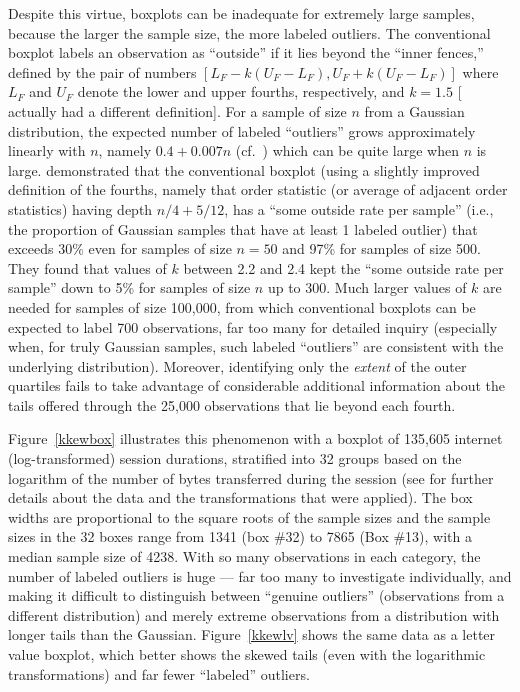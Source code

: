 \documentclass[oneside]{article}
\begin{document}
Despite this virtue, boxplots can be inadequate for extremely large samples,
because the larger the sample size, the more labeled outliers. The
conventional boxplot \citep{eda, emerson83} labels an observation as
``outside'' if it lies beyond the ``inner fences,'' defined by the pair of
numbers $[L_F - k(U_F - L_F), U_F + k(U_F - L_F)]$ where $L_F$ and $U_F$
denote the lower and upper fourths, respectively, and $k = 1.5$ [\citet{eda}
actually had a different definition]. For a sample of size $n$ from a Gaussian
distribution, the expected number of labeled ``outliers'' grows approximately
linearly with $n$, namely $0.4 + 0.007n$ (cf.~\citet{dchlv}) which can be
quite large when $n$ is large. \citet[pg. 1148]{dchbox} demonstrated that the
conventional boxplot (using a slightly improved definition of the fourths,
namely that order statistic (or average of adjacent order statistics) having
depth $n/4 + 5/12$, has a ``some outside rate per sample'' (i.e., the
proportion of Gaussian samples that have at least 1 labeled outlier) that
exceeds 30\% even for samples of size $n = 50$ and 97\% for samples of size
500. They found that values of $k$ between 2.2 and 2.4 kept the ``some outside
rate per sample'' down to 5\% for samples of size $n$ up to 300. Much larger
values of $k$ are needed for samples of size 100,000, from which conventional
boxplots can be expected to label 700 observations, far too many for detailed
inquiry (especially when, for truly Gaussian samples, such labeled
``outliers'' are consistent with the underlying distribution). Moreover,
identifying only the \textit{extent} of the outer quartiles fails to take
advantage of considerable additional information about the tails offered
through the 25,000 observations that lie beyond each fourth.

Figure~\ref{kkewbox} illustrates this phenomenon with a boxplot of 135,605
internet (log-transformed) session durations, stratified into 32 groups based
on the logarithm of the number of bytes transferred during the session (see
\citet{kw06} for further details about the data and the transformations that
were applied). The box widths are proportional to the square roots of the
sample sizes \citep{variations.boxplots} and the sample sizes in the 32 boxes
range from 1341 (box \#32) to 7865 (Box \#13), with a median sample size of
4238. With so many observations in each category, the number of labeled
outliers is huge --- far too many to investigate individually, and making it
difficult to distinguish between ``genuine outliers'' (observations from a
different distribution) and merely extreme observations from a distribution
with longer tails than the Gaussian. Figure~\ref{kkewlv} shows the same data
as a letter value boxplot, which better shows the skewed tails (even with the
logarithmic transformations) and far fewer ``labeled'' outliers.
\end{document}
